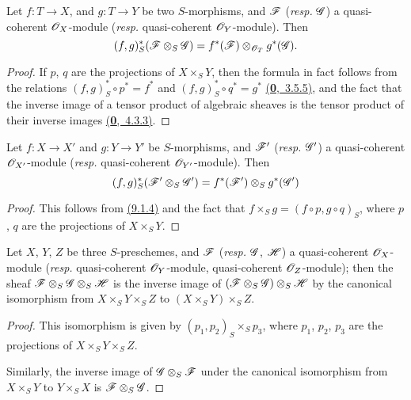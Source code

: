 \begin{prop}[9.1.4]
\label{prop-1.9.1.4}
Let $f:T\to X$, and $g:T\to Y$ be
two $S$-morphisms, and $\mathscr{F}$ ({\it resp.} $\mathscr{G}$) a quasi-coherent
$\mathscr{O}_X$-module ({\it resp.} quasi-coherent $\mathscr{O}_Y$-module). Then
\[
  (f,g)^*_S(\mathscr{F}\otimes_S\mathscr{G})=f^*(\mathscr{F})\otimes_{\mathscr{O}_T}g^*(\mathscr{G}).
\]
\end{prop}

\begin{proof}
\label{proof-prop-1.9.14}
If $p$, $q$ are the projections of $X\times_S Y$, then the formula in fact follows
from the relations $(f,g)^*_S\circ p^*=f^*$ and
$(f,g)^*_S\circ q^*=g^*$ \hyperref[env-0.3.5.5]{(\textbf{0},~3.5.5)}, and the fact that the inverse
image of a tensor product of algebraic sheaves is the tensor product of their inverse
images \hyperref[env-0.4.3.3]{(\textbf{0},~4.3.3)}.
\end{proof}

\begin{cor}[9.1.5]
\label{cor-1.9.1.5}
Let $f:X\to X'$ and $g:Y\to Y'$ be
$S$-morphisms, and $\mathscr{F}'$ ({\it resp.} $\mathscr{G}'$) a quasi-coherent
$\mathscr{O}_{X'}$-module ({\it resp.} quasi-coherent $\mathscr{O}_{Y'}$-module). Then
\[
  (f,g)^*_S(\mathscr{F}'\otimes_S\mathscr{G}')=f^*(\mathscr{F}')\otimes_S g^*(\mathscr{G}')
\]
\end{cor}

\begin{proof}
\label{proof-cor-1.9.1.5}
This follows from \hyperref[prop-1.9.1.4]{(9.1.4)} and the fact that $f\times_S g=(f\circ p, g\circ q)_S$,
where $p$, $q$ are the projections of $X\times_S Y$.
\end{proof}

\begin{cor}[9.1.6]
\label{cor-1.9.1.6}
Let $X$, $Y$, $Z$ be three $S$-preschemes, and $\mathscr{F}$ ({\it resp.} $\mathscr{G}$, $\mathscr{H}$) a
quasi-coherent $\mathscr{O}_X$-module ({\it resp.} quasi-coherent $\mathscr{O}_Y$-module, quasi-coherent
$\mathscr{O}_Z$-module); then the sheaf $\mathscr{F}\otimes_S\mathscr{G}\otimes_S\mathscr{H}$ is the inverse image
of $(\mathscr{F}\otimes_S\mathscr{G})\otimes_S\mathscr{H}$ by the canonical isomorphism from
$X\times_S Y\times_S Z$ to $(X\times_S Y)\times_S Z$.
\end{cor}

\begin{proof}
\label{proof-cor-1.9.16}
This isomorphism is given by $(p_1,p_2)_S\times_S p_3$, where $p_1$, $p_2$, $p_3$
are the projections of $X\times_S Y\times_S Z$.

Similarly, the inverse image of $\mathscr{G}\otimes_S\mathscr{F}$ under the canonical isomorphism from
$X\times_S Y$ to $Y\times_S X$ is $\mathscr{F}\otimes_S\mathscr{G}$.
\end{proof}

